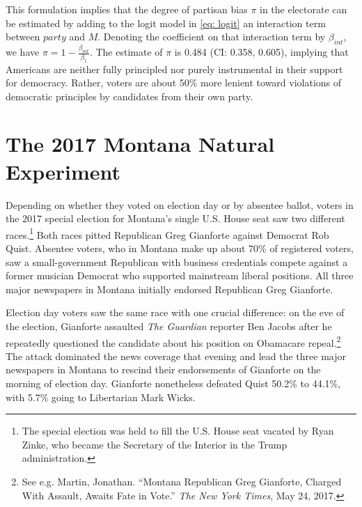 \documentclass[letterpaper, 12pt]{article}
\begin{document}
\begin{raggedright}
This formulation implies that the degree of partisan bias $\pi$ in the electorate can be estimated by adding to the logit model in \eqref{eq: logit} an interaction term between $party$ and $M$. Denoting the coefficient on that interaction term by $\beta_{int}$, we have $\pi = 1- \frac{\beta_{int}}{\beta_1}$. The estimate of $\pi$ is 0.484 (CI: 0.358, 0.605), implying that Americans are neither fully principled nor purely instrumental in their support for democracy. Rather, voters are about 50\% more lenient toward violations of democratic principles by candidates from their own party.

\afterpage{\clearpage}

\section{The 2017 Montana Natural Experiment}
\label{sec: montana}

Depending on whether they voted on election day or by absentee ballot, voters in the 2017 special election for Montana's single U.S. House seat saw two different races.\footnote{The special election was held to fill the U.S. House seat vacated by Ryan Zinke, who became the Secretary of the Interior in the Trump administration.} Both races pitted Republican Greg Gianforte against Democrat Rob Quist. Absentee voters, who in Montana make up about 70\% of registered voters, saw a small-government Republican with business credentials compete against a former musician Democrat who supported mainstream liberal positions. All three major newspapers in Montana initially endorsed Republican Greg Gianforte.

Election day voters saw the same race with one crucial difference: on the eve of the election, Gianforte assaulted \textit{The Guardian} reporter Ben Jacobs after he repeatedly questioned the candidate about his position on Obamacare repeal.\footnote{See e.g. Martin, Jonathan. ``Montana Republican Greg Gianforte, Charged With Assault, Awaits Fate in Vote.'' \emph{The New York Times}, May 24, 2017.} The attack dominated the news coverage that evening and lead the three major newspapers in Montana to rescind their endorsements of Gianforte on the morning of election day. Gianforte nonetheless defeated Quist 50.2\% to 44.1\%, with 5.7\% going to Libertarian Mark Wicks.


\end{raggedright}
\end{document}
